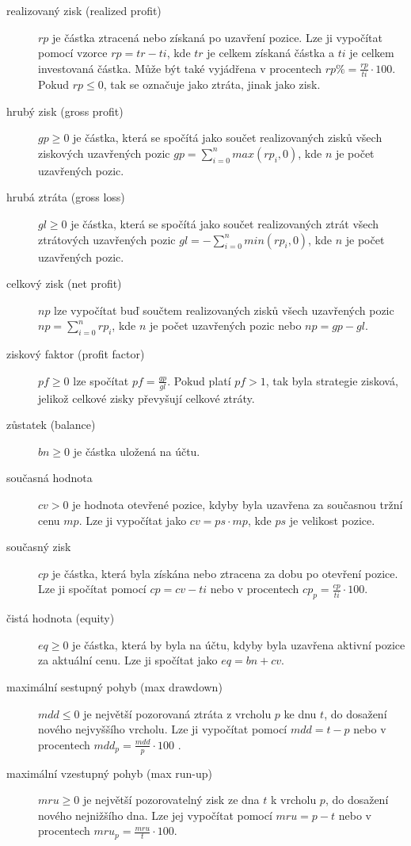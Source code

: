 \begin{description}
    \item [realizovaný zisk (realized profit)] $rp$ je částka ztracená nebo získaná po uzavření pozice.
    Lze ji vypočítat pomocí vzorce $rp=tr-ti$, kde $tr$ je celkem získaná částka a $ti$ je celkem investovaná částka.
    Může být také vyjádřena v procentech $rp\%=\frac{rp}{ti}\cdot 100$.
    Pokud $rp\leq0$, tak se označuje jako ztráta, jinak jako zisk.
    \item[hrubý zisk (gross profit)] $gp\geq0$ je částka, která se spočítá jako součet realizovaných zisků všech ziskových uzavřených pozic $gp=\sum_{i=0}^{n} max(rp_i, 0)$, kde $n$ je počet uzavřených pozic.
    \item[hrubá ztráta (gross loss)] $gl\geq0$ je částka, která se spočítá jako součet realizovaných ztrát všech ztrátových uzavřených pozic $gl=-\sum_{i=0}^{n} min(rp_i, 0)$, kde $n$ je počet uzavřených pozic.
    \item[celkový zisk (net profit)] $np$ lze vypočítat buď součtem realizovaných zisků všech uzavřených pozic $np=\sum_{i=0}^{n} rp_i$, kde $n$ je počet uzavřených pozic nebo $np=gp-gl$.
    \item [ziskový faktor (profit factor)] $pf\geq0$ lze spočítat $pf=\frac{gp}{gl}$.
    Pokud platí $pf>1$, tak byla strategie zisková, jelikož celkové zisky převyšují celkové ztráty.
    \item[zůstatek (balance)] $bn\geq0$ je částka uložená na účtu.
    \item[současná hodnota] $cv>0$ je hodnota otevřené pozice, kdyby byla uzavřena za současnou tržní cenu $mp$.
    Lze ji vypočítat jako $cv=ps\cdot mp$, kde $ps$ je velikost pozice.
    \item[současný zisk] $cp$ je částka, která byla získána nebo ztracena za dobu po otevření pozice.
    Lze ji spočítat pomocí $cp=cv-ti$ nebo v procentech $cp_p = \frac{cp}{ti}\cdot 100$.
    \item[čistá hodnota (equity)] $eq\geq0$ je částka, která by byla na účtu, kdyby byla uzavřena aktivní pozice za aktuální cenu.
    Lze ji spočítat jako $eq=bn+cv$.
    \item[maximální sestupný pohyb (max drawdown)] $mdd\leq0$ je největší pozorovaná ztráta z vrcholu $p$ ke dnu $t$, do dosažení nového nejvyššího vrcholu.
    Lze ji vypočítat pomocí $mdd=t-p$ nebo v procentech $mdd_p=\frac{mdd}{p}\cdot 100$ \cite{max-drawdown}.
    \item[maximální vzestupný pohyb (max run-up)] $mru\geq0$ je největší pozorovatelný zisk ze dna $t$ k vrcholu $p$, do dosažení nového nejnižšího dna.
    Lze jej vypočítat pomocí $mru=p-t$ nebo v procentech $mru_p=\frac{mru}{t}\cdot 100$.
\end{description}

